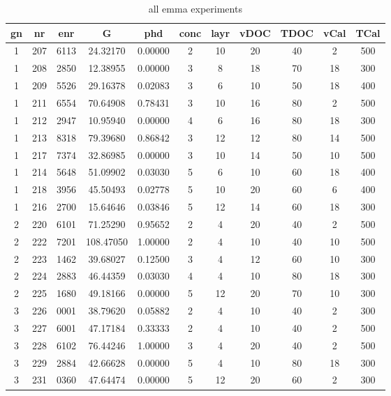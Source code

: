 \begin{table}[h]
	\centering
    \caption{all emma experiments}
	\label{tab:emma_all}
	\begin{tabular}{ccccccccccc}
        \hline\hline
        gn  &nr	    &enr	&G	&phd	&conc	    &layr	&vDOC	&TDOC	&vCal	&TCal\\
        \hline
        1   &207	&6113	&24.32170	&0.00000	&2	&10	&20	&40	&2	&500\\
        1   &208	&2850	&12.38955	&0.00000	&3	&8	&18	&70	&18	&300\\
        1   &209	&5526	&29.16378	&0.02083	&3	&6	&10	&50	&18	&400\\
        1   &211	&6554	&70.64908	&0.78431	&3	&10	&16	&80	&2	&500\\
        1   &212	&2947	&10.95940	&0.00000	&4	&6	&16	&80	&18	&300\\
        1   &213	&8318	&79.39680	&0.86842	&3	&12	&12	&80	&14	&500\\
        1   &217	&7374	&32.86985	&0.00000	&3	&10	&14	&50	&10	&500\\
        1   &214	&5648	&51.09902	&0.03030	&5	&6	&10	&60	&18	&400\\
        1   &218	&3956	&45.50493	&0.02778	&5	&10	&20	&60	&6	&400\\
        1   &216	&2700	&15.64646	&0.03846	&5	&12	&14	&60	&18	&300\\

        2   &220	&6101	&71.25290	&0.95652	&2	&4	&20	&40	&2	&500\\
        2   &222	&7201	&108.47050	&1.00000	&2	&4	&10	&40	&10	&500\\
        2   &223	&1462	&39.68027	&0.12500	&3	&4	&12	&60	&10	&300\\
        2   &224	&2883	&46.44359	&0.03030	&4	&4	&10	&80	&18	&300\\
        2   &225	&1680	&49.18166	&0.00000	&5	&12	&20	&70	&10	&300\\

        3   &226	&0001	&38.79620	&0.05882	&2	&4	&10	&40	&2	&300\\
        3   &227	&6001	&47.17184	&0.33333	&2	&4	&10	&40	&2	&500\\
        3   &228	&6102	&76.44246	&1.00000	&3	&4	&20	&40	&2	&500\\
        3   &229	&2884	&42.66628	&0.00000	&5	&4	&10	&80	&18	&300\\
        3   &231	&0360	&47.64474	&0.00000	&5	&12	&20	&60	&2	&300\\


\end{tabular}
\end{table}
